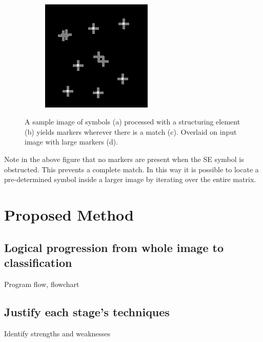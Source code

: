 \documentclass[a4paper,12pt,notitlepage]{article}
\begin{document}
\begin{figure}[H]
\begin{subfigure}[b]{0.3\textwidth}
					\caption{}
				\end{subfigure}\\
				\begin{subfigure}[b]{0.3\textwidth}
					\centering
					\includegraphics[width=\textwidth]{chris/image15}
					\caption{}
				\end{subfigure}
				\caption{A sample image of symbols (a) processed with a structuring element (b) yields markers wherever there is a match (c). Overlaid on input image with large markers (d).}
				\label{fig:hom}
			\end{figure}

			Note in the above figure that no markers are present when the SE symbol is obstructed. This prevents a complete match. In this way it is possible to locate a pre-determined symbol inside a larger image by iterating over the entire matrix.
\pagebreak
\section{Proposed Method}
	\subsection{Logical progression from whole image to classification}
		Program flow, flowchart
	\subsection{Justify each stage’s techniques}
		Identify strengths and weaknesses
\pagebreak
\end{document}
